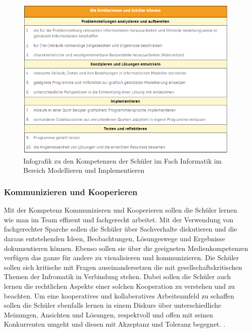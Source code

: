 \begin{figure}[H]
	\centering
	\includegraphics[width=\textwidth,height=\textheight,keepaspectratio]{images/model.png}
	\caption{Infografik zu den Kompetenzen der Schüler im Fach Informatik im Bereich Modellieren und Implementieren \cite{Model}}
	\label{Modellieren und Implementieren Infografik}
\end{figure}

\subsubsection{Kommunizieren und Kooperieren}

Mit der Kompetenz Kommunizieren und Kooperieren  sollen die Schüler lernen wie man im Team effizent und fachgerecht arbeitet. Mit der Verwendung von fachgerechter Sparche sollen die Schüler über Sachverhalte diskutieren und die daraus entstehenden Ideen, Beobachtungen, Lösungeswege und Ergebnisse dokumentieren können. Ebenso sollen sie über die geeigneten Medienkompetenzen verfügen das ganze für andere zu visualisieren und kommunizieren. Die Schüler sollen sich kritische mit Fragen auseinandersetzen die mit gesellschaftskritischen Themen der Infromatik in Verbindung stehen. Dabei sollen die Schüler auch lernen die rechtlichen Aspekte einer solchen Kooperation zu verstehen und zu beachten. Um eine kooperatives und kollaberatives Arbeitsumfeld zu schaffen sollen die Schüler ebenfalls lernen in einem Diskurs über unterschiedliche Meinungen, Ansichten und Lösungen, respektvoll und offen mit seinen Konkurrenten umgeht und diesen mit Akzeptanz und Toleranz begegnet.
\cite{Komm}.

